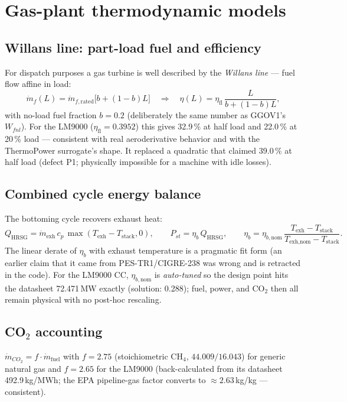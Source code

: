 \documentclass[11pt]{article}
\begin{document}
\section{Gas-plant thermodynamic models}
\label{sec:thermo}

\subsection{Willans line: part-load fuel and efficiency}
For dispatch purposes a gas turbine is well described by the
\emph{Willans line} --- fuel flow affine in load:
\begin{equation}
  \dot m_f(L) = \dot m_{f,\text{rated}}\bigl[b + (1-b)L\bigr]
  \quad\Longrightarrow\quad
  \eta(L) = \eta_\text{fl}\,\frac{L}{b + (1-b)L},
  \label{eq:willans}
\end{equation}
with no-load fuel fraction $b = 0.2$ (deliberately the same number as
GGOV1's $W_{fnl}$). For the LM9000 ($\eta_\text{fl} = 0.3952$) this gives
32.9\,\% at half load and 22.0\,\% at 20\,\% load --- consistent with real
aeroderivative behavior and with the ThermoPower surrogate's shape. It
replaced a quadratic that claimed 39.0\,\% at half load (defect P1;
physically impossible for a machine with idle losses).

\subsection{Combined cycle energy balance}
The bottoming cycle recovers exhaust heat:
\begin{equation}
  Q_\text{HRSG} = \dot m_\text{exh}\, c_p\,
     \max(T_\text{exh} - T_\text{stack}, 0), \qquad
  P_{st} = \eta_b \, Q_\text{HRSG}, \qquad
  \eta_b = \eta_{b,\text{nom}}\,
     \frac{T_\text{exh}-T_\text{stack}}{T_\text{exh,nom}-T_\text{stack}} .
\end{equation}
The linear derate of $\eta_b$ with exhaust temperature is a pragmatic fit
form (an earlier claim that it came from PES-TR1/CIGRE-238 was wrong and
is retracted in the code). For the LM9000 CC, $\eta_{b,\text{nom}}$ is
\emph{auto-tuned} so the design point hits the datasheet 72.471\,MW
exactly (solution: 0.288); fuel, power, and CO$_2$ then all remain
physical with no post-hoc rescaling.

\subsection{CO$_2$ accounting}
$\dot m_{CO_2} = f \cdot \dot m_\text{fuel}$ with $f = 2.75$
(stoichiometric CH$_4$, $44.009/16.043$) for generic natural gas and $f =
2.65$ for the LM9000 (back-calculated from its datasheet 492.9\,kg/MWh;
the EPA pipeline-gas factor converts to $\approx 2.63$\,kg/kg ---
consistent).
\end{document}
